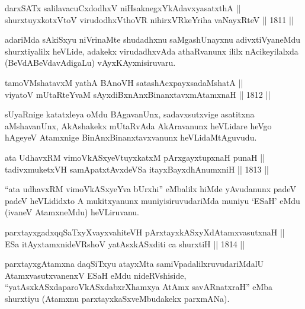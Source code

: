 \begin{shl}
darxSATx salilavacuCxdodhxV niHsaknegxYkAdavxyasatxthA || \\
shurxtuyxkotxV\s toV virudodhxV\s thoVR nihirxVRkeYriha vaNayxRteV \hfill || 1811 ||  
\end{shl}

\begin{artha}
adariMda sAkiSxyu niVrinaMte shudadhxnu saMgashUnayxnu
adivxtiVyaneMdu shurxtiyalilx heVLide, adakekx virudadhxvAda
athaRvanunx ililx nAcikeyilalxda (BeVdABeVdavAdigaLu)
vAyxKAyxnisiruvaru.
\end{artha}


\begin{shl}
tamoVMshatavxM yathA BAnoVH satashAcxpayxsadaMshatA || \\
viyatoV mUtaRteYvaM sAyxdiBxnAnxBinanxtavxmAtamxnaH \hfill || 1812 ||  
\end{shl}

\begin{artha}
sUyaRnige katatxleya oMdu BAgavanUnx, sadavxsutxvige asatitxna
aMshavanUnx, AkAshakekx mUtaRvAda AkAravanunx heVLidare heVgo hAgeyeV
Atamxnige BinAnxBinanxtavxvanunx heVLidaMtAguvudu.
\end{artha}


\begin{shl}
ata UdhavxRM vimoVkASxyeVtuyxkatxM pArxgayxtupxnaH punaH || \\
tadivxmuketxVH samApatxtAvxdeVSa itayxBayxdhAnumxniH \hfill || 1813 ||  
\end{shl}

\begin{artha}
``ata udhavxRM vimoVkASxyeYva bUrxhi'' eMbalilx hiMde yAvudanunx padeV padeV heVLididxto A
mukitxyanunx muniyisiruvudariMda muniyu `ESaH' eMdu (ivaneV
AtamxneMdu) heVLiruvanu.
\end{artha}

\begin{shl}
parxtayxgadxqqSaTxyXvayxvahiteVH pArxtayxkASxyXdAtamxvasutxnaH || \\
ESa itAyxtamxnideVRshoV yatAsxkASxditi ca shurxtiH \hfill || 1814 ||  
\end{shl}

\begin{artha}
parxtayxgAtamxna daqSiTxyu atayxMta samiVpadalilxruvudariMdalU AtamxvasutxvanenxV ESaH eMdu nideRVshiside, ``yatAsxkASxdaparoVkASxdabxrXhamxya AtAmx savARnatxraH'' eMba shurxtiyu (Atamxnu parxtayxkaSxveMbudakekx parxmANa).
\end{artha}

